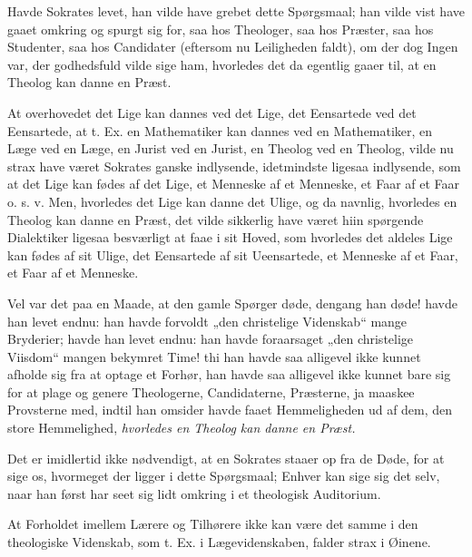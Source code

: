 \documentclass[12pt,a4paper]{book}
\newcommand{\opage}[1]{\marginnote{\footnotesize\textit{[#1]}}}
\begin{document}
Havde Sokrates levet, han vilde have grebet dette Spørgsmaal; han vilde
vist have gaaet omkring og spurgt sig for, saa hos Theologer, saa hos
Præster, saa hos Studenter, saa hos Candidater (eftersom nu Leiligheden
faldt), om der dog Ingen var, der godhedsfuld vilde sige ham, hvorledes det
da egentlig gaaer til, at en Theolog kan danne en Præst.

At overhovedet det Lige kan dannes ved det Lige, det Eensartede ved det
Eensartede, at t. Ex. en Mathematiker kan dannes ved en Mathematiker, en
Læge ved en Læge, en Jurist ved en Jurist, en Theolog ved en Theolog, vilde
nu strax have været Sokrates ganske indlysende, idetmindste ligesaa
indlysende, som at det Lige kan fødes af det Lige, et Menneske af et
Menneske, et Faar af et Faar o. s. v. Men, hvorledes det Lige kan danne det
Ulige, og da navnlig, hvorledes en Theolog kan danne en Præst, det vilde
sikkerlig have været hiin spørgende Dialektiker ligesaa besværligt at faae
i sit Hoved, som hvorledes det aldeles Lige kan fødes af sit Ulige, det
Eensartede af sit Ueensartede, et Menneske af et Faar, et Faar af et
Menneske.

\opage{134} Vel var det paa en Maade, at den gamle Spørger døde, dengang han døde!
havde han levet endnu: han havde forvoldt „den christelige Videnskab“ mange
Bryderier; havde han levet endnu: han havde foraarsaget „den christelige
Viisdom“ mangen bekymret Time! thi han havde saa alligevel ikke kunnet
afholde sig fra at optage et Forhør, han havde saa alligevel ikke kunnet
bare sig for at plage og genere Theologerne, Candidaterne, Præsterne, ja
maaskee Provsterne med, indtil han omsider havde faaet Hemmeligheden ud af
dem, den store Hemmelighed,
\emph{hvorledes en Theolog kan danne en Præst.}

Det er imidlertid ikke nødvendigt, at en Sokrates staaer op fra de Døde,
for at sige os, hvormeget der ligger i dette Spørgsmaal; Enhver kan sige
sig det selv, naar han først har seet sig lidt omkring i et theologisk
Auditorium.

At Forholdet imellem Lærere og Tilhørere ikke kan være det samme i den
theologiske Videnskab, som t. Ex. i Lægevidenskaben, falder strax i Øinene.
\end{document}
